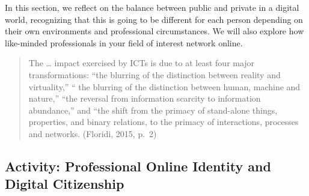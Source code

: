 \documentclass[
  letterpaper,
  DIV=11,
  numbers=noendperiod]{scrreprt}
\begin{document}
In this section, we reflect on the balance between public and private in
a digital world, recognizing that this is going to be different for each
person depending on their own environments and professional
circumstances. We will also explore how like-minded professionals in
your field of interest network online.

\begin{quote}
The \ldots{} impact exercised by ICTs is due to at least four major
transformations: ``the blurring of the distinction between reality and
virtuality,'' `` the blurring of the distinction between human, machine
and nature,'' ``the reversal from information scarcity to information
abundance,'' and ``the shift from the primacy of stand-alone things,
properties, and binary relations, to the primacy of interactions,
processes and networks. (Floridi, 2015, p.~2)
\end{quote}

\subsection{Activity: Professional Online Identity and Digital
Citizenship}\label{activity-professional-online-identity-and-digital-citizenship}
\end{document}
